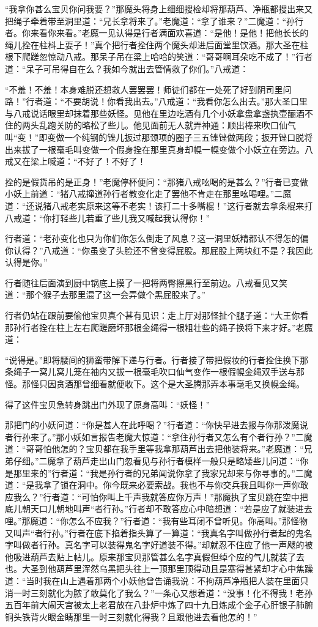 \documentclass[12pt,UTF8]{ctexbook}
\begin{document}
“我拿你甚么宝贝你问我要？”那魔头将身上细细搜检却将那葫芦、净瓶都搜出来又把绳子牵着带至洞里道：“兄长拿将来了。”老魔道：“拿了谁来？”二魔道：“孙行者。你来看你来看。”老魔一见认得是行者满面欢喜道：“是他！是他！把他长长的绳儿拴在柱枓上耍子！”真个把行者拴住两个魔头却进后面堂里饮酒。那大圣在柱根下爬蹉忽惊动八戒。那呆子吊在梁上哈哈的笑道：“哥哥啊耳朵吃不成了！”行者道：“呆子可吊得自在么？我如今就出去管情救了你们。”八戒道：

“不羞！不羞！本身难脱还想救人罢罢罢！师徒们都在一处死了好到阴司里问路！”行者道：“不要胡说！你看我出去。”八戒道：“我看你怎么出去。”那大圣口里与八戒说话眼里却抹着那些妖怪。见他在里边吃酒有几个小妖拿盘拿盏执壶酾酒不住的两头乱跑关防的略松了些儿。他见面前无人就弄神通：顺出棒来吹口仙气叫“变！”即变做一个纯钢的锉儿扳过那颈项的圈子三五锉锉做两段；扳开锉口脱将出来拔了一根毫毛叫变做一个假身拴在那里真身却幌一幌变做个小妖立在旁边。八戒又在梁上喊道：“不好了！不好了！

拴的是假货吊的是正身！”老魔停杯便问：“那猪八戒吆喝的是甚么？”行者已变做小妖上前道：“猪八戒撺道孙行者教变化走了罢他不肯走在那里吆喝哩。”二魔道：“还说猪八戒老实原来这等不老实！该打二十多嘴棍！”这行者就去拿条棍来打八戒道：“你打轻些儿若重了些儿我又喊起我认得你！”

行者道：“老孙变化也只为你们你怎么倒走了风息？这一洞里妖精都认不得怎的偏你认得？”八戒道：“你虽变了头脸还不曾变得屁股。那屁股上两块红不是？我因此认得是你。”

行者随往后面演到厨中锅底上摸了一把将两臀擦黑行至前边。八戒看见又笑道：“那个猴子去那里混了这一会弄做个黑屁股来了。”

行者仍站在跟前要偷他宝贝真个甚有见识：走上厅对那怪扯个腿子道：“大王你看那孙行者拴在柱上左右爬蹉磨坏那根金绳得一根粗壮些的绳子换将下来才好。”老魔道：

“说得是。”即将腰间的狮蛮带解下递与行者。行者接了带把假妆的行者拴住换下那条绳子一窝儿窝儿笼在袖内又拔一根毫毛吹口仙气变作一根假幌金绳双手送与那怪。那怪只因贪酒那曾细看就便收下。这个是大圣腾那弄本事毫毛又换幌金绳。

得了这件宝贝急转身跳出门外现了原身高叫：“妖怪！”

那把门的小妖问道：“你是甚人在此呼喝？”行者道：“你快早进去报与你那泼魔说者行孙来了。”那小妖如言报告老魔大惊道：“拿住孙行者又怎么有个者行孙？”二魔道：“哥哥怕他怎的？宝贝都在我手里等我拿那葫芦出去把他装将来。”老魔道：“兄弟仔细。”二魔拿了葫芦走出山门忽看见与孙行者模样一般只是略矮些儿问道：“你是那里来的”行者道：“我是孙行者的兄弟闻说你拿了我家兄却来与你寻事的。”二魔道：“是我拿了锁在洞中。你今既来必要索战。我也不与你交兵我且叫你一声你敢应我么？”行者道：“可怕你叫上千声我就答应你万声！”那魔执了宝贝跳在空中把底儿朝天口儿朝地叫声“者行孙。”行者却不敢答应心中暗想道：“若是应了就装进去哩。”那魔道：“你怎么不应我？”行者道：“我有些耳闭不曾听见。你高叫。”那怪物又叫声“者行孙。”行者在底下掐着指头算了一算道：“我真名字叫做孙行者起的鬼名字叫做者行孙。真名字可以装得鬼名字好道装不得。”却就忍不住应了他一声飕的被他吸进葫芦去贴上帖儿。原来那宝贝那管甚么名字真假但绰个应的气儿就装了去也。大圣到他葫芦里浑然乌黑把头往上一顶那里顶得动且是塞得甚紧却才心中焦躁道：“当时我在山上遇着那两个小妖他曾告诵我说：不拘葫芦净瓶把人装在里面只消一时三刻就化为脓了敢莫化了我么？”一条心又想着道：“没事！化不得我！老孙五百年前大闹天宫被太上老君放在八卦炉中炼了四十九日炼成个金子心肝银子肺腑铜头铁背火眼金睛那里一时三刻就化得我？且跟他进去看他怎的！”
\end{document}
